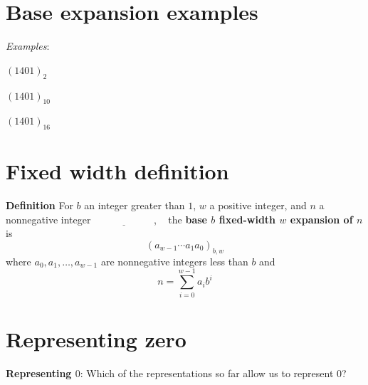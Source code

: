 \documentclass[12pt, oneside]{article}
\begin{document}
 \vfill
\section*{Base expansion examples}




{\it Examples}:

$(1401)_{2}$

\vfill

$(1401)_{10}$

\vfill
\vfill
\vfill


$(1401)_{16}$

\vfill
\vfill
\vfill
 \vfill
\section*{Fixed width definition}


{\bf Definition} For $b$ an integer greater than $1$, $w$ a positive integer, 
and $n$ a nonnegative integer
$\underline{\phantom{\hspace{1in}}}$, ~
the {\bf base $b$ fixed-width $w$ expansion of $n$}  is
\[
(a_{w-1} \cdots a_1 a_0)_{b,w}
\]
where  $a_0, a_1, \ldots, a_{w-1}$ are nonnegative integers less than $b$ and
\[
n =  \sum_{i=0}^{w-1} a_{i} b^{i}
\]
 \vfill
\section*{Representing zero}


{\bf Representing $0$}: Which of the representations so far allow us to represent $0$?

\vfill
\end{document}
